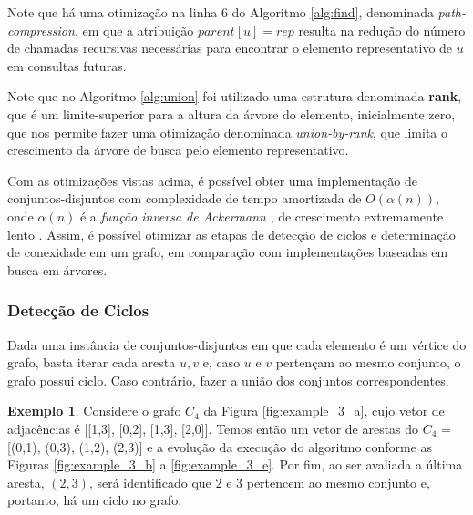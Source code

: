 \documentclass[article,a4paper,12pt,brazil,sumario=tradicional]{abntex2}
\theoremstyle{definition} %
\newtheorem{example}{Exemplo}
\begin{document}


Note que há uma otimização na linha 6 do Algoritmo \ref{alg:find}, denominada \textit{path-compression}, em que a atribuição $parent[u]=rep$ resulta na redução do número de chamadas recursivas necessárias para encontrar o elemento representativo de $u$ em consultas futuras.



Note que no Algoritmo \ref{alg:union} foi utilizado uma estrutura denominada \textbf{rank}, que é um limite-superior para a altura da árvore do elemento, inicialmente zero, que nos permite fazer uma otimização denominada \textit{union-by-rank}, que limita o crescimento da árvore de busca pelo elemento representativo.

Com as otimizações vistas acima, é possível obter uma implementação de conjuntos-disjuntos com complexidade de tempo amortizada de $O(\alpha(n))$, onde $\alpha(n)$ é a \textit{função inversa de Ackermann} \cite{Ackermann1928}, de crescimento extremamente lento \cite{fredman_saks}. Assim, é possível otimizar as etapas de detecção de ciclos e determinação de conexidade em um grafo, em comparação com implementações baseadas em busca em árvores.

\subsubsection{Detecção de Ciclos}

Dada uma instância de conjuntos-disjuntos em que cada elemento é um vértice do grafo, basta iterar cada aresta $u, v$ e, caso $u$ e $v$ pertençam ao mesmo conjunto, o grafo possui ciclo. Caso contrário, fazer a união dos conjuntos correspondentes.





\begin{example}    

Considere o grafo $C_4$ da Figura \ref{fig:example_3_a}, cujo vetor de adjacências é [[1,3], [0,2], [1,3], [2,0]]. Temos então um vetor de arestas do $C_4$ = [(0,1), (0,3), (1,2), (2,3)] e a evolução da execução do algoritmo conforme as Figuras \ref{fig:example_3_b} a \ref{fig:example_3_e}. Por fim, ao ser avaliada a última aresta, $(2,3)$, será identificado que $2$ e $3$ pertencem ao mesmo conjunto e, portanto, há um ciclo no grafo.

\end{example}
\end{document}
